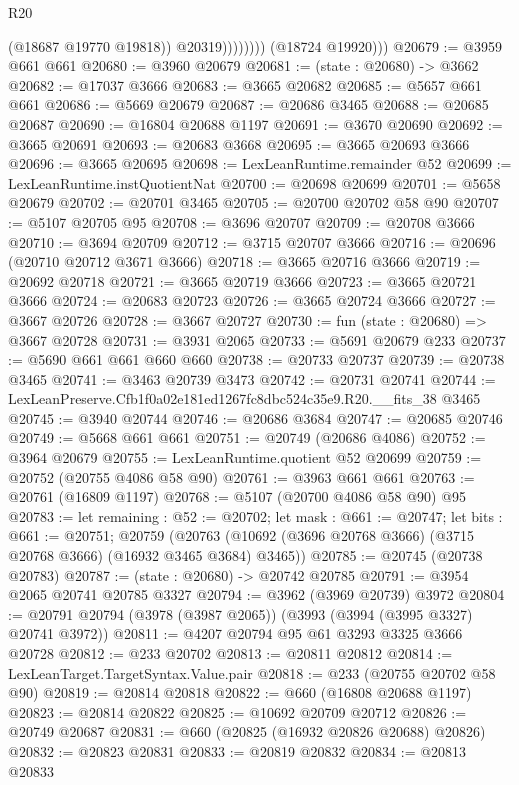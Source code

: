 \begin{lexlean}{R20}
\begin{coremodule}
                          (@18687 @19770 @19818))
                        @20319))))))))
        (@18724 @19920)))
@20679 := @3959 @661 @661
@20680 := @3960 @20679
@20681 := (state : @20680) -> @3662
@20682 := @17037 @3666
@20683 := @3665 @20682
@20685 := @5657 @661 @661
@20686 := @5669 @20679
@20687 := @20686 @3465
@20688 := @20685 @20687
@20690 := @16804 @20688 @1197
@20691 := @3670 @20690
@20692 := @3665 @20691
@20693 := @20683 @3668
@20695 := @3665 @20693 @3666
@20696 := @3665 @20695
@20698 := LexLeanRuntime.remainder @52
@20699 := LexLeanRuntime.instQuotientNat
@20700 := @20698 @20699
@20701 := @5658 @20679
@20702 := @20701 @3465
@20705 := @20700 @20702 @58 @90
@20707 := @5107 @20705 @95
@20708 := @3696 @20707
@20709 := @20708 @3666
@20710 := @3694 @20709
@20712 := @3715 @20707 @3666
@20716 := @20696 (@20710 @20712 @3671 @3666)
@20718 := @3665 @20716 @3666
@20719 := @20692 @20718
@20721 := @3665 @20719 @3666
@20723 := @3665 @20721 @3666
@20724 := @20683 @20723
@20726 := @3665 @20724 @3666
@20727 := @3667 @20726
@20728 := @3667 @20727
@20730 := fun (state : @20680) => @3667 @20728
@20731 := @3931 @2065
@20733 := @5691 @20679 @233
@20737 := @5690 @661 @661 @660 @660
@20738 := @20733 @20737
@20739 := @20738 @3465
@20741 := @3463 @20739 @3473
@20742 := @20731 @20741
@20744 := LexLeanPreserve.Cfb1f0a02e181ed1267fc8dbc524c35e9.R20.__fits_38 @3465
@20745 := @3940 @20744
@20746 := @20686 @3684
@20747 := @20685 @20746
@20749 := @5668 @661 @661
@20751 := @20749 (@20686 @4086)
@20752 := @3964 @20679
@20755 := LexLeanRuntime.quotient @52 @20699
@20759 := @20752 (@20755 @4086 @58 @90)
@20761 := @3963 @661 @661
@20763 := @20761 (@16809 @1197)
@20768 := @5107 (@20700 @4086 @58 @90) @95
@20783 := let remaining : @52 := @20702;
  let mask : @661 := @20747;
  let bits : @661 := @20751;
  @20759 (@20763 (@10692 (@3696 @20768 @3666) (@3715 @20768 @3666) (@16932 @3465 @3684) @3465))
@20785 := @20745 (@20738 @20783)
@20787 := (state : @20680) -> @20742 @20785
@20791 := @3954 @2065 @20741 @20785 @3327
@20794 := @3962 (@3969 @20739) @3972
@20804 := @20791 @20794 (@3978 (@3987 @2065)) (@3993 (@3994 (@3995 @3327) @20741 @3972))
@20811 := @4207 @20794 @95 @61 @3293 @3325 @3666 @20728
@20812 := @233 @20702
@20813 := @20811 @20812
@20814 := LexLeanTarget.TargetSyntax.Value.pair
@20818 := @233 (@20755 @20702 @58 @90)
@20819 := @20814 @20818
@20822 := @660 (@16808 @20688 @1197)
@20823 := @20814 @20822
@20825 := @10692 @20709 @20712
@20826 := @20749 @20687
@20831 := @660 (@20825 (@16932 @20826 @20688) @20826)
@20832 := @20823 @20831
@20833 := @20819 @20832
@20834 := @20813 @20833

\end{coremodule}
\end{lexlean}
